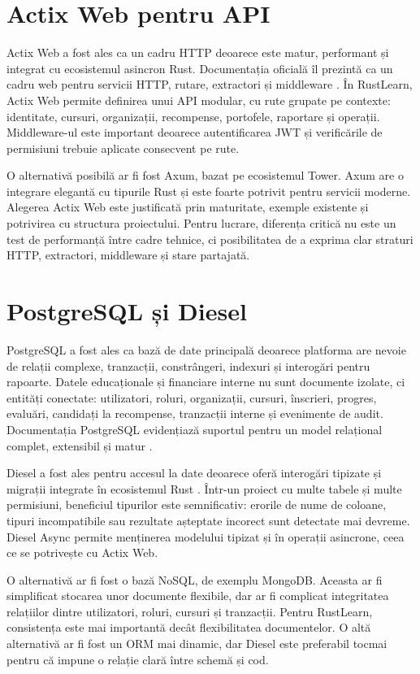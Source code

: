 \section{Actix Web pentru API}
Actix Web a fost ales ca un cadru HTTP deoarece este matur, performant și integrat cu ecosistemul asincron Rust. Documentația oficială îl prezintă ca un cadru web pentru servicii HTTP, rutare, extractori și middleware \cite{actixDocs}. În RustLearn, Actix Web permite definirea unui API modular, cu rute grupate pe contexte: identitate, cursuri, organizații, recompense, portofele, raportare și operații. Middleware-ul este important deoarece autentificarea JWT și verificările de permisiuni trebuie aplicate consecvent pe rute.

O alternativă posibilă ar fi fost Axum, bazat pe ecosistemul Tower. Axum are o integrare elegantă cu tipurile Rust și este foarte potrivit pentru servicii moderne. Alegerea Actix Web este justificată prin maturitate, exemple existente și potrivirea cu structura proiectului. Pentru lucrare, diferența critică nu este un test de performanță între cadre tehnice, ci posibilitatea de a exprima clar straturi HTTP, extractori, middleware și stare partajată.

\section{PostgreSQL și Diesel}
PostgreSQL a fost ales ca bază de date principală deoarece platforma are nevoie de relații complexe, tranzacții, constrângeri, indexuri și interogări pentru rapoarte. Datele educaționale și financiare interne nu sunt documente izolate, ci entități conectate: utilizatori, roluri, organizații, cursuri, înscrieri, progres, evaluări, candidați la recompense, tranzacții interne și evenimente de audit. Documentația PostgreSQL evidențiază suportul pentru un model relațional complet, extensibil și matur \cite{postgresDocs}.

Diesel a fost ales pentru accesul la date deoarece oferă interogări tipizate și migrații integrate în ecosistemul Rust \cite{dieselDocs}. Într-un proiect cu multe tabele și multe permisiuni, beneficiul tipurilor este semnificativ: erorile de nume de coloane, tipuri incompatibile sau rezultate așteptate incorect sunt detectate mai devreme. Diesel Async permite menținerea modelului tipizat și în operații asincrone, ceea ce se potrivește cu Actix Web.

O alternativă ar fi fost o bază NoSQL, de exemplu MongoDB. Aceasta ar fi simplificat stocarea unor documente flexibile, dar ar fi complicat integritatea relațiilor dintre utilizatori, roluri, cursuri și tranzacții. Pentru RustLearn, consistența este mai importantă decât flexibilitatea documentelor. O altă alternativă ar fi fost un ORM mai dinamic, dar Diesel este preferabil tocmai pentru că impune o relație clară între schemă și cod.

